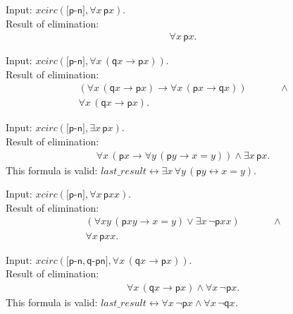 \documentclass[a4paper]{article}
\newcommand{\imp}{\rightarrow}
\newcommand{\equi}{\leftrightarrow}
\newcommand{\pplmacro}[1]{\mathit{#1}}
\newcommand{\pplIsValid}[1]{\noindent This formula is valid: $#1$\par}
\begin{document}
\medskip


\noindent Input: $\pplmacro{xcirc}({[}\mathsf{p}\textrm{-}\mathsf{n}{]},\forall \mathit{x} \, \mathsf{p}\mathit{x}).$\\
\noindent Result of elimination:
\[\begin{array}{lllll}
\forall \mathit{x} \, \mathsf{p}\mathit{x}.
\end{array}
\]

\noindent Input: $\pplmacro{xcirc}({[}\mathsf{p}\textrm{-}\mathsf{n}{]},\forall \mathit{x} \, (\mathsf{q}\mathit{x} \imp  \mathsf{p}\mathit{x})).$\\
\noindent Result of elimination:
\[\begin{array}{lllll}
(\forall \mathit{x} \, (\mathsf{q}\mathit{x} \imp  \mathsf{p}\mathit{x}) \imp  \forall \mathit{x} \, (\mathsf{p}\mathit{x} \imp  \mathsf{q}\mathit{x})) &&&&\; \land \\
\forall \mathit{x} \, (\mathsf{q}\mathit{x} \imp  \mathsf{p}\mathit{x}).
\end{array}
\]

\noindent Input: $\pplmacro{xcirc}({[}\mathsf{p}\textrm{-}\mathsf{n}{]},\exists \mathit{x} \, \mathsf{p}\mathit{x}).$\\
\noindent Result of elimination:
\[\begin{array}{lllll}
\forall \mathit{x} \, (\mathsf{p}\mathit{x} \imp  \forall \mathit{y} \, (\mathsf{p}\mathit{y} \imp  \mathit{x}=\mathit{y})) \land  \exists \mathit{x} \, \mathsf{p}\mathit{x}.
\end{array}
\]
\pplIsValid{\pplmacro{last\_result} \equi  \exists \mathit{x} \, \forall \mathit{y} \, (\mathsf{p}\mathit{y} \equi  \mathit{x}=\mathit{y}).}
%
%

\medskip


\noindent Input: $\pplmacro{xcirc}({[}\mathsf{p}\textrm{-}\mathsf{n}{]},\forall \mathit{x} \, \mathsf{p}\mathit{x}\mathit{x}).$\\
\noindent Result of elimination:
\[\begin{array}{lllll}
(\forall \mathit{x}\mathit{y} \, (\mathsf{p}\mathit{x}\mathit{y} \imp  \mathit{x}=\mathit{y}) \lor  \exists \mathit{x} \, \lnot  \mathsf{p}\mathit{x}\mathit{x}) &&&&\; \land \\
\forall \mathit{x} \, \mathsf{p}\mathit{x}\mathit{x}.
\end{array}
\]

\noindent Input: $\pplmacro{xcirc}({[}\mathsf{p}\textrm{-}\mathsf{n},\mathsf{q}\textrm{-}\mathsf{pn}{]},\forall \mathit{x} \, (\mathsf{q}\mathit{x} \imp  \mathsf{p}\mathit{x})).$\\
\noindent Result of elimination:
\[\begin{array}{lllll}
\forall \mathit{x} \, (\mathsf{q}\mathit{x} \imp  \mathsf{p}\mathit{x}) \land  \forall \mathit{x} \, \lnot  \mathsf{p}\mathit{x}.
\end{array}
\]
\pplIsValid{\pplmacro{last\_result} \equi  \forall \mathit{x} \, \lnot  \mathsf{p}\mathit{x} \land  \forall \mathit{x} \, \lnot  \mathsf{q}\mathit{x}.}
%
%
\end{document}
